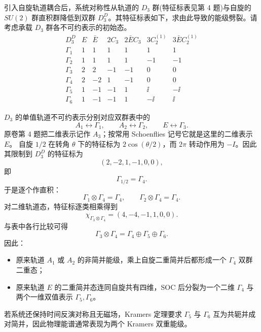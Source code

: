 \begin{question}[10 分]
引入自旋轨道耦合后，系统对称性从轨道的 $D_3$ 群(特征标表见第 4 题)与自旋的 $SU(2)$ 群直积群降低到双群 $D_3^D$。其特征标表如下，求由此导致的能级劈裂。请考虑承载 $D_3$ 群各不可约表示的初始态。
\[
\begin{array}{c|rrrrrr}
D_3^D&E&\bar E&2C_3&2\bar E C_3&3C_2^{(1)}&3\bar E C_2^{(1)}\\\hline
\Gamma_1&1&1&1&1&1&1\\
\Gamma_2&1&1&1&1&-1&-1\\
\Gamma_3&2&2&-1&-1&0&0\\
\Gamma_4&2&-2&1&-1&0&0\\
\Gamma_5&1&-1&-1&1&\ii&-\ii\\
\Gamma_6&1&-1&-1&1&-\ii&\ii
\end{array}
\]
\begin{solution}
$D_3$ 的单值轨道不可约表示分别对应双群表中的
\[
A_1\leftrightarrow\Gamma_1,\qquad
A_2\leftrightarrow\Gamma_2,\qquad
E\leftrightarrow\Gamma_3.
\]
原卷第 4 题把二维表示记作 $A_3$；按常用 Schoenflies 记号它就是这里的二维表示 $E$。
自旋 $1/2$ 在转角 $\theta$ 下的特征标为 $2\cos(\theta/2)$，而 $2\pi$ 转动作用为 $-I$。因此其限制到 $D_3^D$ 的特征标为
\[
(2,-2,1,-1,0,0),
\]
即
\[
\boxed{\Gamma_{1/2}=\Gamma_4}.
\]
于是逐个作直积：
\[
\Gamma_1\otimes\Gamma_4=\Gamma_4,
\qquad
\Gamma_2\otimes\Gamma_4=\Gamma_4.
\]
对二维轨道态，特征标逐类相乘得到
\[
\chi_{\Gamma_3\otimes\Gamma_4}=(4,-4,-1,1,0,0).
\]
与表中各行比较可得
\[
\boxed{\Gamma_3\otimes\Gamma_4
=\Gamma_4\oplus\Gamma_5\oplus\Gamma_6}.
\]
因此：
\begin{itemize}
  \item 原来轨道 $A_1$ 或 $A_2$ 的非简并能级，乘上自旋二重简并后都形成一个 $\Gamma_4$ 双群二重态；
  \item 原来轨道 $E$ 的二重简并态连同自旋共有四维，SOC 后分裂为一个二维 $\Gamma_4$ 与两个一维双值表示 $\Gamma_5,\Gamma_6$。
\end{itemize}
若系统还保持时间反演对称且无磁场，Kramers 定理要求 $\Gamma_5$ 与 $\Gamma_6$ 互为共轭并成对简并，因此物理能谱通常表现为两个 Kramers 双重能级。
\end{solution}
\end{question}
